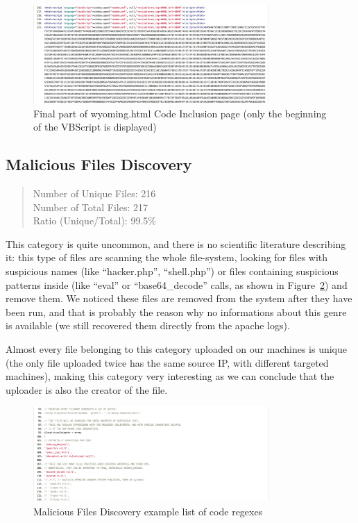  \begin{figure}[H]
\centerline{\includegraphics[width=0.8\textwidth]{Images/codeInclusion.jpg}}
\caption{Final part of wyoming.html Code Inclusion page (only the beginning of the VBScript is displayed)\label{fig:codeInclusion}}
\end{figure}

\subsection{Malicious Files Discovery}

\begin{quote}
Number of Unique Files: 216\\
Number of Total Files: 217\\
Ratio (Unique/Total): 99.5\%
\end{quote}

This category is quite uncommon, and there is no scientific literature describing it: this type of files are scanning the whole file-system, looking for files with suspicious names (like ``hacker.php'', ``shell.php'') or files containing suspicious patterns inside (like ``eval'' or ``base64\_decode'' calls, as shown in Figure~\ref{fig:maliciousFilesDiscovery}) and remove them. We noticed these files are removed from the system after they have been run, and that is probably the reason why no informations about this genre is available (we still recovered them directly from the apache logs).

Almost every file belonging to this category uploaded on our machines is unique (the only file uploaded twice has the same source IP, with different targeted machines), making this category very interesting as we can conclude that the uploader is also the creator of the file.

 \begin{figure}[H]
\centerline{\includegraphics[width=0.8\textwidth]{Images/maliciousFilesDiscovery.jpg}}
\caption{Malicious Files Discovery example list of code regexes\label{fig:maliciousFilesDiscovery}}
\end{figure}

